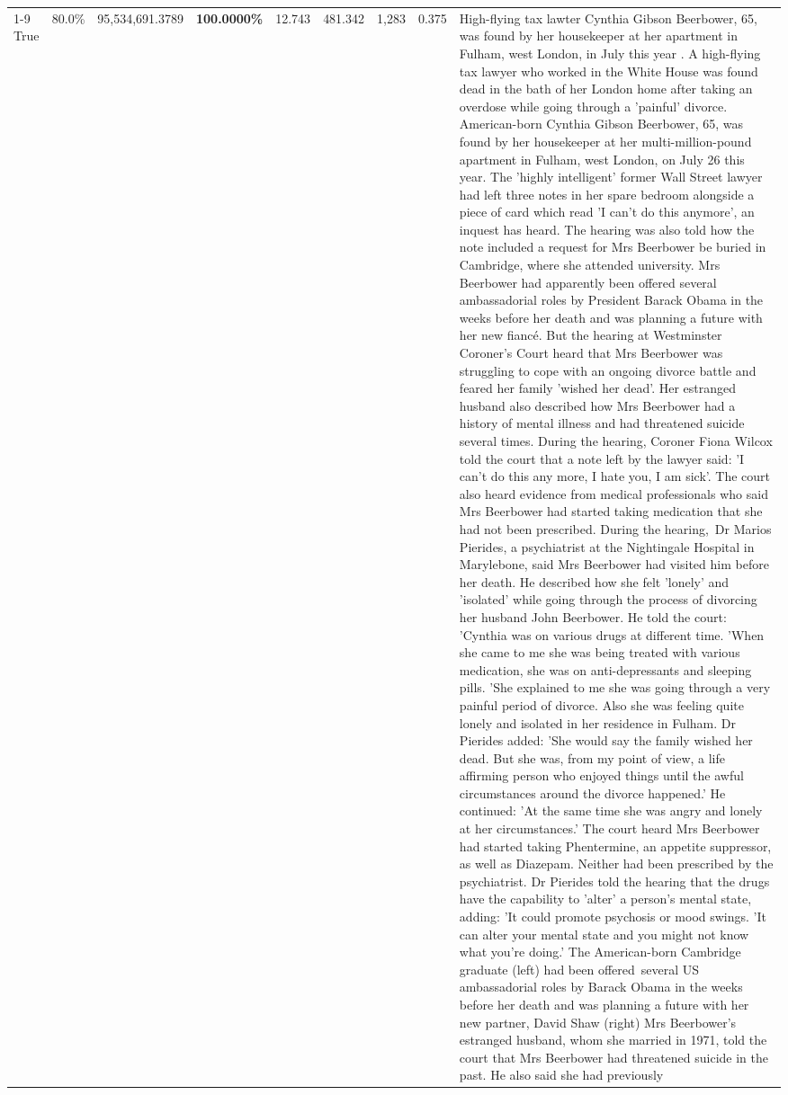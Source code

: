 \begin{table}[H]
\begin{tabular}{lllrlllll}
\cline{1-9}
True & 80.0\% & 95,534,691.3789 & \bfseries \color{red} 100.0000\% & 12.743 & 481.342 & 1,283 & 0.375 & High-flying tax lawter Cynthia Gibson Beerbower, 65, was found by her housekeeper at her apartment in Fulham, west London, in July this year . A high-flying tax lawyer who worked in the White House was found dead in the bath of her London home after taking an overdose while going through a 'painful' divorce. American-born Cynthia Gibson Beerbower, 65, was found by her housekeeper at her multi-million-pound apartment in Fulham, west London, on July 26 this year. The 'highly intelligent' former Wall Street lawyer had left three notes in her spare bedroom alongside a piece of card which read 'I can't do this anymore', an inquest has heard. The hearing was also told how the note included a request for Mrs Beerbower be buried in Cambridge, where she attended university. Mrs Beerbower had apparently been offered several ambassadorial roles by President Barack Obama in the weeks before her death and was planning a future with her new fiancé. But the hearing at Westminster Coroner's Court heard that Mrs Beerbower was struggling to cope with an ongoing divorce battle and feared her family 'wished her dead'. Her estranged husband also described how Mrs Beerbower had a history of mental illness and had threatened suicide several times. During the hearing, Coroner Fiona Wilcox told the court that a note left by the lawyer said: 'I can't do this any more, I hate you, I am sick'. The court also heard evidence from medical professionals who said Mrs Beerbower had started taking medication that she had not been prescribed. During the hearing, Dr Marios Pierides, a psychiatrist at the Nightingale Hospital in Marylebone, said Mrs Beerbower had visited him before her death. He described how she felt 'lonely' and 'isolated' while going through the process of divorcing her husband John Beerbower. He told the court: 'Cynthia was on various drugs at different time. 'When she came to me she was being treated with various medication, she was on anti-depressants and sleeping pills. 'She explained to me she was going through a very painful period of divorce. Also she was feeling quite lonely and isolated in her residence in Fulham. Dr Pierides added: 'She would say the family wished her dead. But she was, from my point of view, a life affirming person who enjoyed things until the awful circumstances around the divorce happened.' He continued: 'At the same time she was angry and lonely at her circumstances.' The court heard Mrs Beerbower had started taking Phentermine, an appetite suppressor, as well as Diazepam. Neither had been prescribed by the psychiatrist. Dr Pierides told the hearing that the drugs have the capability to 'alter' a person's mental state, adding: 'It could promote psychosis or mood swings. 'It can alter your mental state and you might not know what you're doing.' The American-born Cambridge graduate (left) had been offered several US ambassadorial roles by Barack Obama in the weeks before her death and was planning a future with her new partner, David Shaw (right) Mrs Beerbower's estranged husband, whom she married in 1971, told the court that Mrs Beerbower had threatened suicide in the past. He also said she had previously 
\end{tabular}
\end{table}
